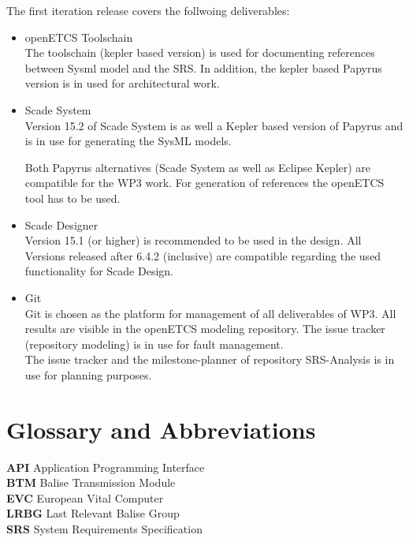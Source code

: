 \documentclass{template/openetcs_report}
\begin{document}
The first iteration release covers the follwoing deliverables:
\begin{itemize}
\item openETCS Toolschain\\
The toolschain (kepler based version) is used for documenting references between Sysml model and the SRS.
In addition, the kepler based Papyrus version is in used for architectural work.

\item Scade System\\
Version 15.2 of Scade System is as well a Kepler based version of Papyrus and is in use for generating the SysML models. 

Both Papyrus alternatives (Scade System as well as Eclipse Kepler) are compatible for the WP3 work. For generation of references the openETCS tool has to be used.

\item Scade Designer\\
Version 15.1 (or higher) is recommended to be used in the design. All Versions released after  6.4.2 (inclusive) are compatible regarding the used functionality for Scade Design.  

\item Git\\
Git is chosen as the platform for management of all deliverables of WP3. All results are visible in the openETCS modeling repository. The issue tracker (repository modeling) is in use for fault management.\\

The issue tracker and the milestone-planner of repository SRS-Analysis is in use for planning purposes.

\end{itemize}

\section{Glossary and Abbreviations}

\textbf{API} Application Programming Interface\\
\textbf{BTM} Balise Transmission Module\\
\textbf{EVC} European Vital Computer\\
\textbf{LRBG} Last Relevant Balise Group\\
\textbf{SRS} System Requirements Specification\\

\end{document}
